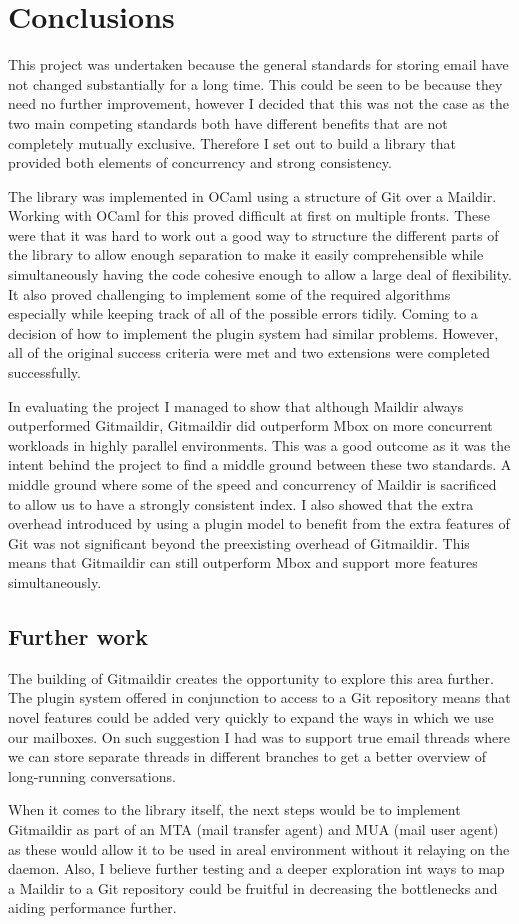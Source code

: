 \chapter{Conclusions}

This project was undertaken because the general standards for storing email have not changed substantially for a long time. This could be seen to be because they need no further improvement, however I decided that this was not the case as the two main competing standards both have different benefits that are not completely mutually exclusive. Therefore I set out to build a library that provided both elements of concurrency and strong consistency.

The library was implemented in OCaml using a structure of Git over a Maildir. Working with OCaml for this proved difficult at first on multiple fronts. These were that it was hard to work out a good way to structure the different parts of the library to allow enough separation to make it easily comprehensible while simultaneously having the code cohesive enough to allow a large deal of flexibility. It also proved challenging to implement some of the required algorithms especially while keeping track of all of the possible errors tidily. Coming to a decision of how to implement the plugin system had similar problems. However, all of the original success criteria were met and two extensions were completed successfully.

In evaluating the project I managed to show that although Maildir always outperformed Gitmaildir, Gitmaildir did outperform Mbox on more concurrent workloads in highly parallel environments. This was a good outcome as it was the intent behind the project to find a middle ground between these two standards. A middle ground where some of the speed and concurrency of Maildir is sacrificed to allow us to have a strongly consistent index. I also showed that the extra overhead introduced by using a plugin model to benefit from the extra features of Git was not significant beyond the preexisting overhead of Gitmaildir. This means that Gitmaildir can still outperform Mbox and support more features simultaneously.

\section{Further work}

The building of Gitmaildir creates the opportunity to explore this area further. The plugin system offered in conjunction to access to a Git repository means that novel features could be added very quickly to expand the ways in which we use our mailboxes. On such suggestion I had was to support true email threads where we can store separate threads in different branches to get a better overview of long-running conversations.

When it comes to the library itself, the next steps would be to implement Gitmaildir as part of an MTA (mail transfer agent) and MUA (mail user agent) as these would allow it to be used in areal environment without it relaying on the daemon. Also, I believe further testing and a deeper exploration int ways to map a Maildir to a Git repository could be fruitful in decreasing the bottlenecks and aiding performance further.

